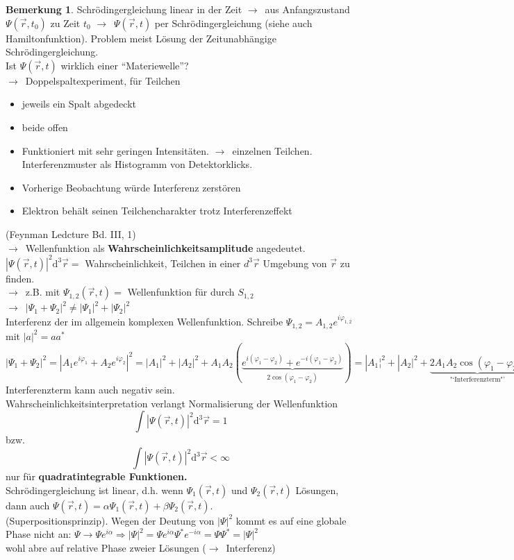 \documentclass[oneside]{book}
\theoremstyle{definition}
\newtheorem*{bemerkung*}{Bemerkung}
\newcommand{\conseq}{$\rightarrow$~}
\newcommand{\circled}[1]{\tikz[baseline=(char.base)]{
		\node[shape=circle,draw,inner sep=2pt] (char) {#1};}}
\renewcommand{\d}{\mathrm d}
\newcommand{\vp}{\varphi}
\newcommand{\celectron}{\circled{$e^-$}}
\begin{document}
\begin{bemerkung*}
	Schrödingergleichung linear in der Zeit \conseq aus Anfangszustand $\Psi(\vec{r}, t_0)$ zu Zeit $t_0$ \conseq $\Psi(\vec{r}, t)$ per Schrödingergleichung (siehe auch Hamiltonfunktion). Problem meist Lösung der Zeitunabhängige Schrödingergleichung.\\
	Ist $\Psi(\vec{r}, t)$ wirklich einer "`Materiewelle"'?\\
	\conseq Doppelspaltexperiment, für Teilchen \celectron
	\begin{itemize}
		\item jeweils ein Spalt abgedeckt
		\item beide offen
	\end{itemize}
	\begin{itemize}
		\item Funktioniert mit sehr geringen Intensitäten. \conseq einzelnen Teilchen. Interferenzmuster als Histogramm von Detektorklicks.
		\item Vorherige Beobachtung würde Interferenz zerstören
		\item Elektron behält seinen Teilchencharakter trotz Interferenzeffekt
	\end{itemize}
	(Feynman Ledcture Bd. III, 1)\\
	\conseq Wellenfunktion als \textbf{Wahrscheinlichkeitsamplitude} angedeutet.\\
	$|\Psi(\vec{r}, t)|^2 \d^3 \vec{r} = $ Wahrscheinlichkeit, Teilchen in einer $d^3 \vec{r}$ Umgebung von $\vec{r}$ zu finden.\\
	\conseq z.B. mit $\Psi_{1,2}(\vec{r}, t) = $ Wellenfunktion für \celectron durch $S_{1, 2}$\\
	\conseq $|\Psi_1 + \Psi_2|^2 \neq |\Psi_1|^2 + |\Psi_2|^2$\\
	Interferenz der im allgemein komplexen Wellenfunktion. Schreibe $\Psi_{1,2}= A_{1,2} e^{i\vp_{1,2}}$ mit $|a|^2 = a a^\ast$\\
	$|\Psi_1 + \Psi_2|^2 = |A_1 e^{i\vp_1} + A_2 e^{i \vp_2}|^2 = |A_1|^2 + |A_2|^2 + A_1 A_2 (\underbrace{e^{i(\vp_1 - \vp_2)} + e^{-i(\vp_1 - \vp_2)}}_{2\cos(\vp_1 - \vp_2)}) = |A_1¦^2 + |A_2|^2 + \underbrace{2 A_1 A_2 \cos(\vp_1 - \vp_2)}_{\text{"`Interferenzterm"'}}$\\
	Interferenzterm kann auch negativ sein.\\
	Wahrscheinlichkeitsinterpretation verlangt Normalisierung der Wellenfunktion
	$$\int |\Psi(\vec{r}, t)|^2 \d^3 \vec{r} = 1$$
	bzw.
	$$\int |\Psi(\vec{r}, t)|^2 \d^3 \vec{r} < \infty$$
	nur für \textbf{quadratintegrable Funktionen.}\\
	Schrödingergleichung ist linear, d.h. wenn $\Psi_1(\vec{r}, t)$ und $\Psi_2(\vec{r}, t)$ Lösungen, dann auch $\Psi(\vec{r}, t) = \alpha \Psi_1(\vec{r}, t) + \beta \Psi_2(\vec{r}, t)$.\\
	(Superpositionsprinzip). Wegen der Deutung von $|\Psi|^2$ kommt es auf eine globale Phase nicht an: $\Psi \to \Psi e^{i\alpha} \Rightarrow |\Psi|^2 = \Psi e^{i\alpha} \Psi^\ast e^{-i\alpha} = \Psi \Psi^\ast = |\Psi|^2$\\
	wohl abre auf relative Phase zweier Lösungen (\conseq Interferenz)

\end{bemerkung*}
\end{document}
